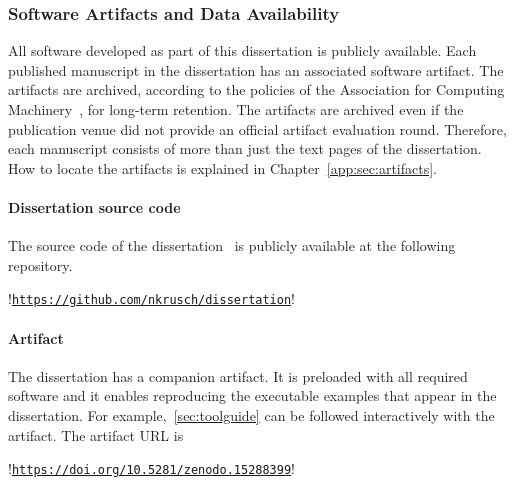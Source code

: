 \subsubsection{Software Artifacts and Data Availability}

All software developed as part of this dissertation is publicly available. Each
published manuscript in the dissertation has an associated software artifact.
The artifacts are archived, according to the policies of the Association for
Computing Machinery~\cite{acm_badging}, for long-term retention. The artifacts
are archived even if the publication venue did not provide an official artifact
evaluation round. Therefore, each manuscript consists of more than just the text
pages of the dissertation. How to locate the artifacts is explained
in Chapter~\autoref{app:sec:artifacts}.


\paragraph*{Dissertation source code}
The source code of the dissertation~\cite{diss} is publicly available at the
following repository.

\noindent\begin{minipage}{\textwidth}
\begin{browserlisting}[nolol,escapeinside=!!]
!\href{https://github.com/nkrusch/dissertation}
{\texttt{https://github.com/nkrusch/dissertation}}!
\end{browserlisting}
\end{minipage}

\paragraph*{Artifact}
The dissertation has a companion artifact. It is preloaded with all required
software and it enables reproducing the executable examples that appear in the
dissertation. For example,~\autoref{sec:toolguide} can be followed interactively
with the artifact. The artifact URL is

\noindent\begin{minipage}{\textwidth}
\begin{browserlisting}[nolol,escapeinside=!!]
!\href{https://doi.org/10.5281/zenodo.15288399}
{\texttt{https://doi.org/10.5281/zenodo.15288399}}!
\end{browserlisting}
\end{minipage}

